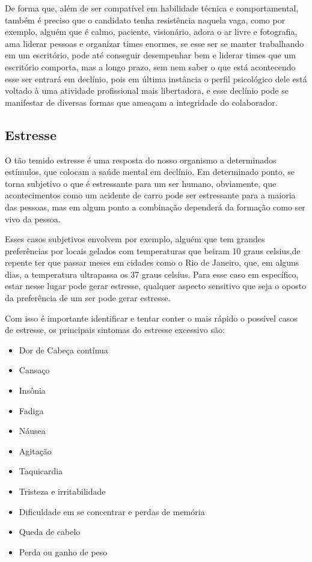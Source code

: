 \documentclass[12pt]{article}
\begin{document}
De forma que, além de ser compatível em habilidade técnica e comportamental, também é preciso que o candidato tenha resistência naquela vaga, como por exemplo, alguém que é calmo, paciente, visionário, adora o ar livre e fotografia, ama liderar pessoas e organizar times enormes, se esse ser se manter trabalhando em um escritório, pode até conseguir desempenhar bem e liderar times que um escritório comporta, mas a longo prazo, sem nem saber o que está acontecendo esse ser entrará em declínio, pois em última instância o perfil psicológico dele está voltado à uma atividade profissional mais libertadora, e esse declínio pode se manifestar de diversas formas que ameaçam a integridade do colaborador.

\subsection{Estresse}

O tão temido estresse é uma resposta do nosso organismo a determinados estímulos, que colocam a saúde mental em declínio. Em determinado ponto, se torna subjetivo o que é estressante para um ser humano, obviamente, que acontecimentos como um acidente de carro pode ser estressante para a maioria das pessoas, mas em algum ponto a combinação dependerá da formação como ser vivo da pessoa.

Esses casos subjetivos envolvem por exemplo, alguém que tem grandes preferências por locais gelados com temperaturas que beiram 10 graus celsius,de repente ter que passar meses em cidades como o Rio de Janeiro, que, em alguns dias, a temperatura ultrapassa os 37 graus celsius. Para esse caso em específico, estar nesse lugar pode gerar estresse, qualquer aspecto sensitivo que seja o oposto da preferência de um ser pode gerar estresse.

Com isso é importante identificar e tentar conter o mais rápido o possível casos de estresse, os principais sintomas do estresse excessivo são:
\begin{itemize}
	\item Dor de Cabeça contínua
	\item Cansaço
	\item Insônia
	\item Fadiga
	\item Náusea
	\item Agitação
	\item Taquicardia
	\item Tristeza e irritabilidade
	\item Dificuldade em se concentrar e perdas de memória
	\item Queda de cabelo
	\item Perda ou ganho de peso
\end{itemize}
\end{document}
